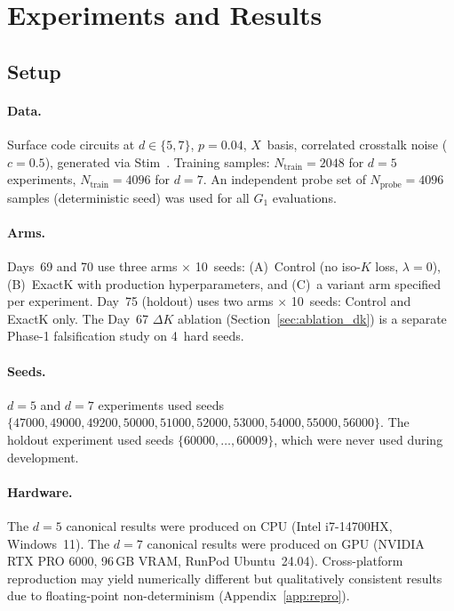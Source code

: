 
\section{Experiments and Results}
\label{sec:experiments}

\subsection{Setup}

\paragraph{Data.} Surface code circuits at $d \in \{5, 7\}$, $p = 0.04$, $X$~basis, correlated crosstalk noise ($c{=}0.5$), generated via Stim~\cite{PLACEHOLDER_stim}. Training samples: $N_{\text{train}}{=}2048$ for $d{=}5$ experiments, $N_{\text{train}}{=}4096$ for $d{=}7$. An independent probe set of $N_{\text{probe}}{=}4096$ samples (deterministic seed) was used for all $G_1$ evaluations.

\paragraph{Arms.} Days~69 and 70 use three arms $\times$ 10~seeds: (A)~Control (no iso-$K$ loss, $\lambda{=}0$), (B)~ExactK with production hyperparameters, and (C)~a variant arm specified per experiment. Day~75 (holdout) uses two arms $\times$ 10~seeds: Control and ExactK only. The Day~67 $\Delta K$ ablation (Section~\ref{sec:ablation_dk}) is a separate Phase-1 falsification study on 4~hard seeds.

\paragraph{Seeds.} $d{=}5$ and $d{=}7$ experiments used seeds $\{47000, 49000, 49200, 50000, 51000, 52000, 53000, 54000, 55000, 56000\}$. The holdout experiment used seeds $\{60000, \ldots, 60009\}$, which were never used during development.

\paragraph{Hardware.} The $d{=}5$ canonical results were produced on CPU (Intel i7-14700HX, Windows~11). The $d{=}7$ canonical results were produced on GPU (NVIDIA RTX PRO 6000, 96\,GB VRAM, RunPod Ubuntu~24.04). Cross-platform reproduction may yield numerically different but qualitatively consistent results due to floating-point non-determinism (Appendix~\ref{app:repro}).

